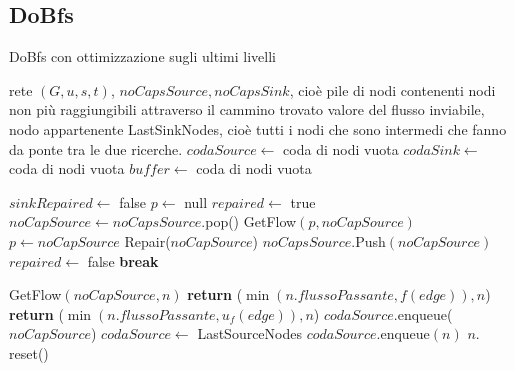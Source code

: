 \documentclass{article}
\begin{document}
\subsection{DoBfs}
\begin{algorithm}
    \caption{DoBfs con ottimizzazione sugli ultimi livelli}
    \begin{algorithmic}[1]
        \REQUIRE rete $(G,u,s,t)$, $noCapsSource, noCapsSink$, cioè pile di nodi contenenti nodi non più raggiungibili attraverso il cammino trovato
        \ENSURE valore del flusso inviabile, nodo appartenente LastSinkNodes, cioè tutti i nodi che sono intermedi che fanno da ponte tra le due ricerche.
        \STATE $codaSource \leftarrow$ coda di nodi vuota
        \STATE $codaSink \leftarrow$ coda di nodi vuota
        \STATE $buffer \leftarrow$ coda di nodi vuota

        \STATE $sinkRepaired \leftarrow$ false
        \STATE $p \leftarrow $ null
        \STATE $repaired \leftarrow $ true
        \STATE $noCapSource \leftarrow noCapsSource.$pop()
        \STATE GetFlow$(p,noCapSource)$
        \STATE $p \leftarrow noCapSource$
        \STATE Repair($noCapSource$)
        \STATE $noCapsSource.$Push$(noCapSource)$
        \STATE $repaired \leftarrow$ false
        \STATE \textbf{break}
        \ENDIF
        \ENDWHILE
    \end{algorithmic}
\end{algorithm}
\newpage
\begin{algorithm}
    \begin{algorithmic}
        \STATE GetFlow$(noCapSource,n)$ 
        \STATE \textbf{return} ($\min(n.flussoPassante,f(edge)),n$)
        \ELSE
        \STATE \textbf{return} ($\min(n.flussoPassante,u_f(edge)),n$)
        \ENDIF
        \ENDIF
        \ENDFOR
        \ENDIF
        \STATE $codaSource.$enqueue($noCapSource$)
        \STATE $codaSource \leftarrow$ LastSourceNodes 
        \ELSE
        \STATE $codaSource.$enqueue$(n) $
        \ENDFOR
        \STATE $n.$reset()
        \ENDFOR
        \ENDIF
        \ENDIF
        \ENDIF

    \end{algorithmic}
\end{algorithm}
\end{document}
